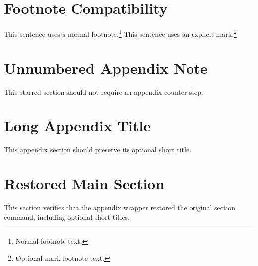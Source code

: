\documentclass{article}
\begin{document}
\section{Footnote Compatibility}
This sentence uses a normal footnote.\footnote{Normal footnote text.}
This sentence uses an explicit mark.\footnote[7]{Optional mark footnote text.}

\startappendices

\section*{Unnumbered Appendix Note}
This starred section should not require an appendix counter step.

\section[Short Appendix]{Long Appendix Title}
This appendix section should preserve its optional short title.

\finishappendices

\section[Short Main]{Restored Main Section}
This section verifies that the appendix wrapper restored the original section
command, including optional short titles.
\end{document}
